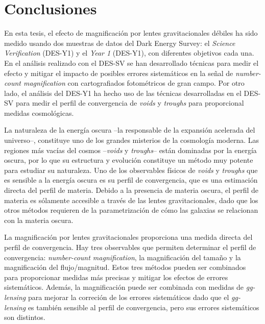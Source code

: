\section*{Conclusiones}
En esta tesis, el efecto de magnificaci\'on por lentes gravitacionales d\'ebiles ha sido medido usando dos muestras de datos del Dark Energy Survey: el {\it Science Verification} (DES-Y1) y el {\it Year 1} (DES-Y1), con diferentes objetivos cada una. En el an\'alisis realizado con el DES-SV se han desarrollado t\'ecnicas para medir el efecto y mitigar el impacto de posibles errores sistem\'aticos en la se\~nal de {\it number-count magnification} con cartografiados fotom\'etricos de gran campo. Por otro lado, el an\'alisis del DES-Y1 ha hecho uso de las t\'ecnicas desarrolladas en el DES-SV para medir el perfil de convergencia de {\it voids} y {\it troughs} para proporcional medidas cosmol\'ogicas.
\newline

La naturaleza de la energ\'ia oscura --la responsable de la expansi\'on acelerada del universo--, constituye uno de los grandes misterios de la cosmolog\'ia moderna. Las regiones m\'as vac\'ias del cosmos --{\it voids} y {\it troughs}-- est\'an dominadas por la energ\'ia oscura, por lo que su estructura y evoluci\'on constituye un m\'etodo muy potente para estudiar su naturaleza. Uno de los observables f\'isicos de {\it voids} y {\it troughs} que es sensible a la energ\'ia oscura es su perfil de convergencia, que es una estimaci\'on directa del perfil de materia. Debido a la presencia de materia oscura, el perfil de materia es s\'olamente accesible a trav\'es de las lentes gravitacionales, dado que los otros m\'etodos requieren de la parametrizaci\'on de c\'omo las galaxias se relacionan con la materia oscura.
\newline

La magnificaci\'on por lentes gravitacionales proporciona una medida directa del perfil de convergencia. Hay tres observables que permiten determinar el perfil de convergencia: {\it number-count magnification}, la magnificaci\'on del tama\~no y la magnificaci\'on del flujo/magnitud. Estos tres m\'etodos pueden ser combinados para proporcionar medidas m\'as precisas y mitigar los efectos de errores sistem\'aticos. Adem\'as, la magnificaci\'on puede ser combinada con medidas de {\it gg-lensing} para mejorar la correci\'on de los errores sistem\'aticos dado que el {\it gg-lensing} es tambi\'en sensible al perfil de convergencia, pero sus errores sistem\'aticos son distintos.